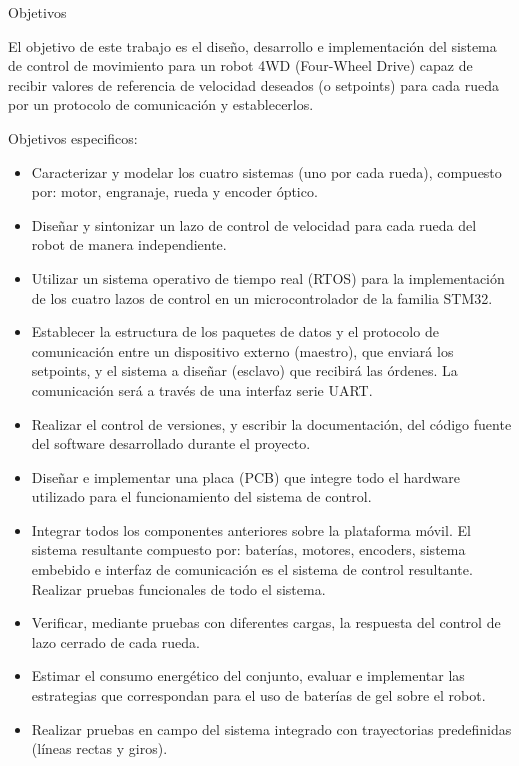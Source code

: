     {\LARGE Objetivos}

  
    El objetivo de este trabajo es el diseño, desarrollo e implementación del sistema de control de movimiento para un robot 4WD (Four-Wheel Drive) capaz de recibir valores de referencia de velocidad deseados (o setpoints) para cada rueda por un protocolo de comunicación y establecerlos.
      
    
    Objetivos especificos:
    \begin{itemize}
        \item Caracterizar y modelar los cuatro sistemas (uno por cada rueda), compuesto por: motor, engranaje, rueda y encoder óptico.
        \item Diseñar y sintonizar un lazo de control de velocidad para cada rueda del robot de manera independiente.
        \item Utilizar un sistema operativo de tiempo real (RTOS) para la implementación de los cuatro lazos de control en un microcontrolador de la familia STM32. 
        \item Establecer la estructura de los paquetes de datos y el protocolo de comunicación entre un dispositivo externo (maestro), que enviará los setpoints, y el sistema a diseñar (esclavo) que recibirá las órdenes. La comunicación será a través de una interfaz serie UART.
        \item Realizar el control de versiones, y escribir la documentación, del código fuente del software desarrollado durante el proyecto.
        \item Diseñar e implementar una placa (PCB) que integre todo el hardware utilizado para el funcionamiento del sistema de control.
        \item Integrar todos los componentes anteriores sobre la plataforma móvil. El sistema resultante compuesto por: baterías, motores, encoders, sistema embebido e interfaz de comunicación es el sistema de control resultante. Realizar pruebas funcionales de todo el sistema.
        \item Verificar, mediante pruebas con diferentes cargas, la respuesta del control de lazo cerrado de cada rueda.
        \item Estimar el consumo energético del conjunto, evaluar e implementar las estrategias que correspondan para el uso de baterías de gel sobre el robot.
        \item Realizar pruebas en campo del sistema integrado con trayectorias predefinidas (líneas rectas y giros).

      \end{itemize}
